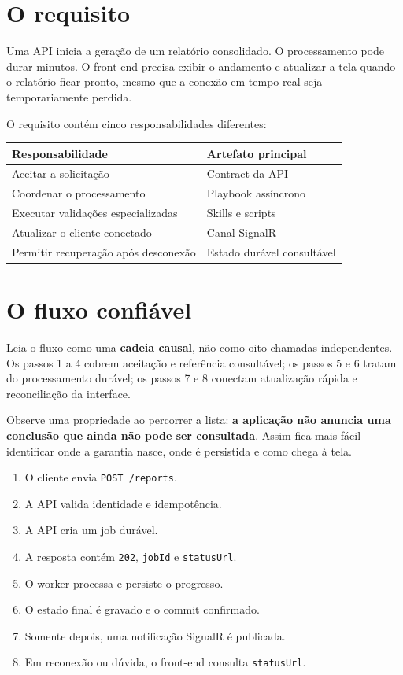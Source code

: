\documentclass[
  10pt,
  a4paper,
  oneside]{book}
\providecommand{\tightlist}{%
  \setlength{\itemsep}{0pt}\setlength{\parskip}{0pt}}
\begin{document}
\hypertarget{o-requisito}{%
\section{O requisito}\label{o-requisito}}

Uma API inicia a geração de um relatório consolidado. O processamento
pode durar minutos. O front-end precisa exibir o andamento e atualizar a
tela quando o relatório ficar pronto, mesmo que a conexão em tempo real
seja temporariamente perdida.

O requisito contém cinco responsabilidades diferentes:

\begin{longtable}[]{@{}ll@{}}
\toprule\noalign{}
Responsabilidade & Artefato principal \\
\midrule\noalign{}
\endhead
\bottomrule\noalign{}
\endlastfoot
Aceitar a solicitação & Contract da API \\
Coordenar o processamento & Playbook assíncrono \\
Executar validações especializadas & Skills e scripts \\
Atualizar o cliente conectado & Canal SignalR \\
Permitir recuperação após desconexão & Estado durável consultável \\
\end{longtable}

\hypertarget{o-fluxo-confiuxe1vel}{%
\section{O fluxo confiável}\label{o-fluxo-confiuxe1vel}}

Leia o fluxo como uma \textbf{cadeia causal}, não como oito chamadas
independentes. Os passos 1 a 4 cobrem aceitação e referência
consultável; os passos 5 e 6 tratam do processamento durável; os passos
7 e 8 conectam atualização rápida e reconciliação da interface.

Observe uma propriedade ao percorrer a lista: \textbf{a aplicação não
anuncia uma conclusão que ainda não pode ser consultada}. Assim fica
mais fácil identificar onde a garantia nasce, onde é persistida e como
chega à tela.

\begin{enumerate}
\def\labelenumi{\arabic{enumi}.}
\tightlist
\item
  O cliente envia \texttt{POST\ /reports}.
\item
  A API valida identidade e idempotência.
\item
  A API cria um job durável.
\item
  A resposta contém \texttt{202}, \texttt{jobId} e \texttt{statusUrl}.
\item
  O worker processa e persiste o progresso.
\item
  O estado final é gravado e o commit confirmado.
\item
  Somente depois, uma notificação SignalR é publicada.
\item
  Em reconexão ou dúvida, o front-end consulta \texttt{statusUrl}.
\end{enumerate}
\end{document}
